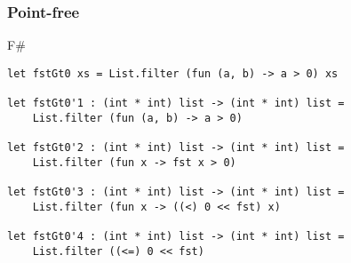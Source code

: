 \documentclass[xetex,mathserif,serif]{beamer}
\begin{document}
	\begin{frame}[fragile]
		\frametitle{Point-free}
		\begin{exampleblock}{F\#}
			\begin{lstlisting}
let fstGt0 xs = List.filter (fun (a, b) -> a > 0) xs

let fstGt0'1 : (int * int) list -> (int * int) list = 
    List.filter (fun (a, b) -> a > 0)

let fstGt0'2 : (int * int) list -> (int * int) list = 
    List.filter (fun x -> fst x > 0)

let fstGt0'3 : (int * int) list -> (int * int) list = 
    List.filter (fun x -> ((<) 0 << fst) x)

let fstGt0'4 : (int * int) list -> (int * int) list = 
    List.filter ((<=) 0 << fst)
\end{lstlisting}
\end{exampleblock}
\end{frame}
\end{document}
